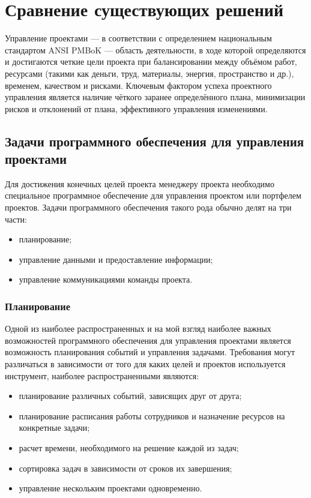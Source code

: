 \documentclass[a4paper, 14pt]{extarticle}
\begin{document}
\newpage


\section{Сравнение существующих решений}
Управление проектами --- в соответствии с определением национальным стандартом
ANSI PMBoK — область деятельности, в ходе которой определяются и достигаются
четкие цели проекта при балансировании между объёмом работ, ресурсами 
(такими как деньги, труд, материалы, энергия, пространство и др.), временем, качеством и рисками. 
Ключевым фактором успеха проектного управления является наличие чёткого заранее определённого плана,
минимизации рисков и отклонений от плана, эффективного управления изменениями.~\cite{wiki_pm}

\subsection{Задачи программного обеспечения для управления проектами}
Для достижения конечных целей проекта менеджеру проекта необходимо специальное программное обеспечение
для управления проектом или портфелем проектов.
Задачи программного обеспечения такого рода обычно делят на три части:
\begin{itemize}
  \item планирование;
  \item управление данными и предоставление информации;
  \item управление коммуникациями команды проекта.
\end{itemize}

\subsubsection{Планирование}
Одной из наиболее распространенных и на мой взгляд наиболее важных возможностей
программного обеспечения для управления проектами является возможность планирования
событий и управления задачами. Требования могут различаться в зависимости от того
для каких целей и проектов используется инструмент, наиболее распространенными являются:
\begin{itemize}
  \item планирование различных событий, зависящих друг от друга;
  \item планирование расписания работы сотрудников и назначение ресурсов на конкретные задачи;
  \item расчет времени, необходимого на решение каждой из задач;
  \item сортировка задач в зависимости от сроков их завершения;
  \item управление нескольким проектами одновременно.
\end{itemize}
\end{document}
